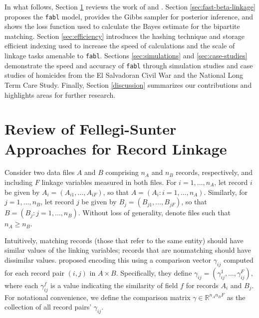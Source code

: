 \documentclass[ba]{imsart}
\begin{document}
In what follows, Section \ref{sec:review-of_prior-work} reviews the work of \cite{fellegi_theory_1969} and \cite{sadinle_bayesian_2017}. Section \ref{sec:fast-beta-linkage} proposes the \texttt{fabl} model, provides the Gibbs sampler for posterior inference, and shows the loss function used to calculate the Bayes estimate for the bipartite matching. Section \ref{sec:efficiency} introduces the hashing technique and storage efficient indexing used to increase the speed of calculations and the scale of linkage tasks amenable to \texttt{fabl}. Sections \ref{sec:simulations} and \ref{sec:case-studies} demonstrate the speed and accuracy of \texttt{fabl} through simulation studies and case studies of homicides from the El Salvadoran Civil War and the National Long Term Care Study. Finally, Section \ref{discussion} summarizes our contributions and highlights areas for further research.

\section{Review of Fellegi-Sunter Approaches for Record Linkage}
\label{sec:review-of_prior-work}

Consider two data files $A$ and $B$ comprising $n_A$ and $n_B$ records, respectively, and including $F$ linkage variables measured in both files. For $i=1, \dots, n_A$, let record $i$ be given by $A_i = (A_{i1}, \dots, A_{iF})$, so that $A = (A_i : i = 1, \dots, n_A)$.  Similarly, for $j=1, \dots, n_B$, let record $j$ be given by $B_j = (B_{j1}, \dots, B_{jF})$, so that $B = (B_j : j = 1, \dots, n_B)$.  Without loss of generality, denote files such that $n_A \geq n_B$.


Intuitively, matching records (those that refer to the same entity) should have similar values of the linking variables; records that are nonmatching should have dissimilar values. \cite{fellegi_theory_1969} proposed encoding this using a comparison vector $\gamma_{ij}$ computed for each record pair $(i,j)$ in $A \times B.$  Specifically, they define $\gamma_{ij} = (\gamma_{ij}^1, \ldots, \gamma_{ij}^F),$ where each $\gamma_{ij}^f$ is a value indicating the similarity of field $f$ for records $A_i$ and $B_j$. For notational convenience, we define the comparison matrix $\gamma \in \mathbb{R}^{n_A n_B F}$ as the collection of all record pairs' $\gamma_{ij}$.  
\end{document}
